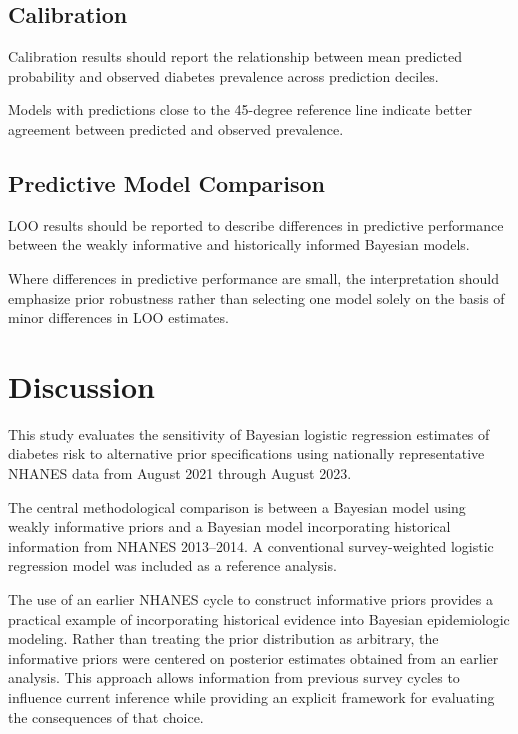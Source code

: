 \documentclass[12pt]{article}
\begin{document}
\subsection{Calibration}

Calibration results should report the relationship between mean predicted probability and observed diabetes prevalence across prediction deciles.

Models with predictions close to the 45-degree reference line indicate better agreement between predicted and observed prevalence.

\subsection{Predictive Model Comparison}

LOO results should be reported to describe differences in predictive performance between the weakly informative and historically informed Bayesian models.

Where differences in predictive performance are small, the interpretation should emphasize prior robustness rather than selecting one model solely on the basis of minor differences in LOO estimates.


\section{Discussion}

This study evaluates the sensitivity of Bayesian logistic regression estimates of diabetes risk to alternative prior specifications using nationally representative NHANES data from August 2021 through August 2023.

The central methodological comparison is between a Bayesian model using weakly informative priors and a Bayesian model incorporating historical information from NHANES 2013--2014. A conventional survey-weighted logistic regression model was included as a reference analysis.

The use of an earlier NHANES cycle to construct informative priors provides a practical example of incorporating historical evidence into Bayesian epidemiologic modeling. Rather than treating the prior distribution as arbitrary, the informative priors were centered on posterior estimates obtained from an earlier analysis. This approach allows information from previous survey cycles to influence current inference while providing an explicit framework for evaluating the consequences of that choice.
\end{document}
